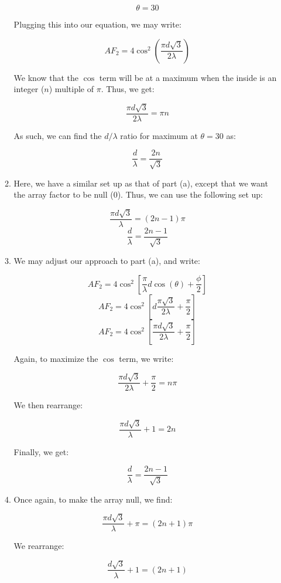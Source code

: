 \begin{enumerate}
\begin{enumerate}
        $$\theta=30$$

        Plugging this into our equation, we may write:

        $$AF_2=4\cos^2\left(\frac{\pi d\sqrt{3}}{2\lambda}\right)$$

        We know that the $\cos$ term will be at a maximum when the inside is an integer ($n$) multiple of $\pi$. Thus, we get:

        $$\frac{\pi d\sqrt{3}}{2\lambda}=\pi n$$

        As such, we can find the $d/\lambda$ ratio for maximum at $\theta=30$ as:

        $$\boxed{\frac{d}{\lambda}=\frac{2n}{\sqrt{3}}}$$

      \item 

        Here, we have a similar set up as that of part (a), except that we want the array factor to be null (0). Thus, we can use the following set up:

        $$\frac{\pi d\sqrt{3}}{\lambda}=(2n-1)\pi$$
        $$\boxed{\frac{d}{\lambda}=\frac{2n-1}{\sqrt{3}}}$$

      \item 

        We may adjust our approach to part (a), and write:

        $$AF_2=4\cos^2\left[ \frac{\pi}{\lambda} d\cos(\theta)+\frac{\phi}{2} \right]$$
        $$AF_2=4\cos^2\left[  d\frac{\pi\sqrt{3}}{2\lambda}+\frac{\pi}{2} \right]$$
        $$AF_2=4\cos^2\left[ \frac{\pi d\sqrt{3}}{2\lambda}+\frac{\pi}{2} \right]$$

        Again, to maximize the $\cos$ term, we write:

        $$\frac{\pi d\sqrt{3}}{2\lambda}+\frac{\pi}{2}=n\pi$$

        We then rearrange:

        $$\frac{\pi d\sqrt{3}}{\lambda}+1=2n$$

        Finally, we get:

        $$\boxed{\frac{d}{\lambda}=\frac{2n-1}{\sqrt{3}}}$$

      \item 

        Once again, to make the array null, we find:

        $$\frac{\pi d\sqrt{3}}{\lambda}+\pi=(2n+1)\pi$$

        We rearrange:

        $$\frac{d\sqrt{3}}{\lambda}+1=\left( 2n+1\right)$$


\end{enumerate}
\end{enumerate}

